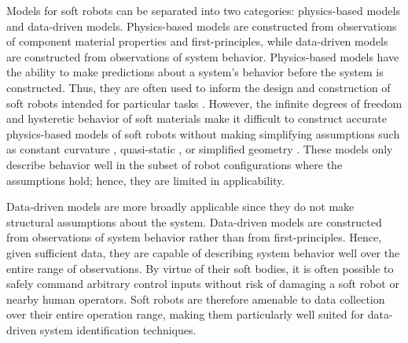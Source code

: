 Models for soft robots can be separated into two categories: physics-based models and data-driven models.
Physics-based models are constructed from observations of component material properties and first-principles, while data-driven models are constructed from observations of system behavior.
Physics-based models have the ability to make predictions about a system's behavior before the system is constructed.
Thus, they are often used to inform the design and construction of soft robots intended for particular tasks \cite{bishop2015design, bruder2018iros, renda2014dynamic, felt2018closed, neppalli2009closed}.
However, the infinite degrees of freedom and hysteretic behavior of soft materials make it difficult to construct accurate physics-based models of soft robots without making simplifying assumptions such as constant curvature \cite{webster2010design, jones2006kinematics}, quasi-static \cite{george2018control, gravagne2003large, trivedi2008geometrically}, or simplified geometry \cite{bruder2017model, sedal2017constitutive, bishop2012parallel}.
These models only describe behavior well in the subset of robot configurations where the assumptions hold; hence, they are limited in applicability.

Data-driven models are more broadly applicable since they do not make structural assumptions about the system.
Data-driven models are constructed from observations of system behavior rather than from first-principles.
Hence, given sufficient data, they are capable of describing system behavior well over the entire range of observations.
By virtue of their soft bodies, it is often possible to safely command arbitrary control inputs without risk of damaging a soft robot or nearby human operators.
Soft robots are therefore amenable to data collection over their entire operation range, making them particularly well suited for data-driven system identification techniques.

